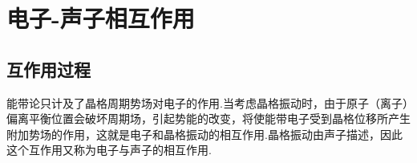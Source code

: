 \chapter{电子-声子相互作用}

\section{互作用过程}

能带论只计及了晶格周期势场对电子的作用.当考虑晶格振动时，由于原子（离子）偏离平衡位置会破坏周期场，引起势能的改变，将使能带电子受到晶格位移所产生附加势场的作用，这就是电子和晶格振动的相互作用.晶格振动由声子描述，因此这个互作用又称为电子与声子的相互作用.

